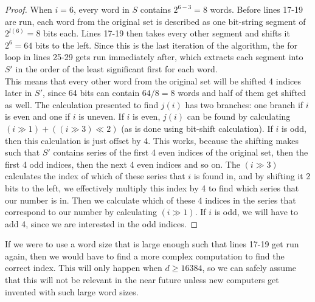 \begin{proof}
When $i=6$, every word in $S$ contains $2^{6-3}=8$ words. Before lines 17-19 are run, each word from the original set is described as one bit-string segment of $2^{l(6)}=8$ bits each.
Lines 17-19 then takes every other segment and shifts it $2^6=64$ bits to the left. Since this is the last iteration of the algorithm, the for loop in lines 25-29 gets run immediately after, which extracts each segment into $S'$ in the order of the least significant first for each word.\\
This means that every other word from the original set will be shifted 4 indices later in $S'$, since 64 bits can contain $64/8=8$ words and half of them get shifted as well. 
The calculation presented to find $j(i)$ has two branches: one branch if $i$ is even and one if $i$ is uneven. If $i$ is even, $j(i)$ can be found by calculating $(i \gg 1) + ((i\gg 3) \ll 2)$ (as is done using bit-shift calculation). If $i$ is odd, then this calculation is just offset by 4.
This works, because the shifting makes such that $S'$ contains series of the first 4 even indices of the original set, then the first 4 odd indices, then the next 4 even indices and so on. The $(i \gg 3)$ calculates the index of which of these series that $i$ is found in, and by shifting it 2 bits to the left, we effectively multiply this index by 4 to find which series that our number is in. Then we calculate which of these 4 indices in the series that correspond to our number by calculating $(i \gg 1)$. If $i$ is odd, we will have to add 4, since we are interested in the odd indices.
\end{proof}
If we were to use a word size that is large enough such that lines 17-19 get run again, then we would have to find a more complex computation to find the correct index. This will only happen when $d\geq16384$, so we can safely assume that this will not be relevant in the near future unless new computers get invented with such large word sizes.
